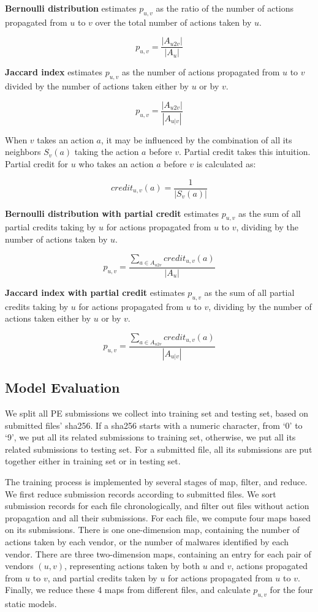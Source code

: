 {\bf Bernoulli distribution} estimates $p_{u,v}$ as the ratio of the number of actions 
propagated from $u$ to $v$ over the total number of actions taken by $u$.

$$p_{u,v} = \frac{|A_{u2v}|}{|A_u|}$$ 

{\bf Jaccard index} estimates 
$p_{u,v}$ as the number of actions propagated from $u$ to $v$ divided by 
the number of actions taken either by $u$ or by $v$.

$$p_{u,v} = \frac{|A_{u2v}|}{|A_{u|v}|}$$ 

When $v$ takes an action $a$, it may be influenced by the combination of all its neighbors $S_v(a)$ 
taking the action $a$ before $v$. Partial credit takes this intuition. 
Partial credit for $u$ who takes an action $a$ before $v$ is calculated as:

$$credit_{u,v}(a) = \frac{1}{|S_v(a)|}$$

{\bf Bernoulli distribution with partial credit} 
estimates $p_{u,v}$ as the sum of all partial credits taking by $u$ for actions propagated from $u$ to $v$, 
dividing by the number of actions taken by $u$. 

$$p_{u,v} = \frac{\sum\limits_{a \in A_{u2v}}{credit_{u,v}(a)}}{|A_u|}$$

{\bf Jaccard index with partial credit} 
estimates $p_{u,v}$ as the sum of all partial credits taking by $u$ for actions propagated from $u$ to $v$, 
dividing by the number of actions taken either by $u$ or by $v$. 

$$p_{u,v} = \frac{\sum\limits_{a \in A_{u2v}}{credit_{u,v}(a)}}{|A_{u|v}|}$$




\subsection{Model Evaluation}
\label{sec:predict}

We split all PE submissions we collect into training set and testing set, based on submitted files' sha256. 
If a sha256 starts with a numeric character, 
from ‘0’ to ‘9’, we put all its related submissions to training set, 
otherwise, we put all its related submissions to testing set.  
For a submitted file, all its submissions are put together either in training set or in testing set. 

The training process is implemented by several stages of map, filter, and reduce. 
We first reduce submission records according to submitted files. 
We sort submission records for each file chronologically, 
and filter out files without action propagation and all their submissions. 
For each file, we compute four maps based on its submissions.
There is one one-dimension map, 
containing the number of actions taken by each vendor, 
or the number of malwares identified by each vendor. 
There are three two-dimension maps, 
containing an entry for each pair of vendors $(u,v)$, 
representing actions taken by both $u$ and $v$, actions propagated from $u$ to $v$, 
and partial credits taken by $u$ for actions propagated from $u$ to $v$. 
Finally, we reduce these 4 maps from different files, 
and calculate $p_{u,v}$ for the four static models. 


